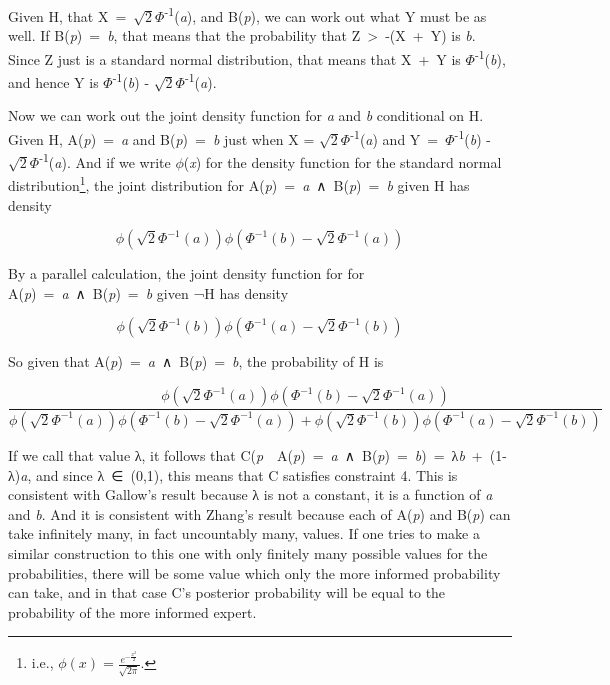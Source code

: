 \documentclass[
  11pt,
  letterpaper,
  DIV=11,
  numbers=noendperiod,
  twoside]{scrartcl}
\begin{document}
Given H, that X~=~\(\sqrt{2}\Phi\)\textsuperscript{-1}(\emph{a}), and
B(\emph{p}), we can work out what Y must be as well. If
B(\emph{p})~=~\emph{b}, that means that the probability that
Z~\textgreater~-(X~+~Y) is \emph{b}. Since Z just is a standard normal
distribution, that means that X~+~Y is
\(\Phi\)\textsuperscript{-1}(\emph{b}), and hence Y is
\(\Phi\)\textsuperscript{-1}(\emph{b}) -
\(\sqrt{2}\Phi\)\textsuperscript{-1}(\emph{a}).

Now we can work out the joint density function for \emph{a} and \emph{b}
conditional on H. Given H, A(\emph{p})~=~\emph{a} and
B(\emph{p})~=~\emph{b} just when X =
\(\sqrt{2}\Phi\)\textsuperscript{-1}(\emph{a}) and
Y~=~\(\Phi\)\textsuperscript{-1}(\emph{b}) -
\(\sqrt{2}\Phi\)\textsuperscript{-1}(\emph{a}). And if we write
\(\phi\)(\emph{x}) for the density function for the standard normal
distribution\footnote{i.e.,
  \(\phi(x) = \frac{e^{-\frac{x^2}{2}}}{\sqrt{2\pi}}\).}, the joint
distribution for A(\emph{p})~=~\emph{a}~∧~B(\emph{p})~=~\emph{b} given H
has density

\[
\phi(\sqrt{2}\Phi^{-1}(a)) \phi(\Phi^{-1}(b) - \sqrt{2}\Phi^{-1}(a))
\]

\noindent By a parallel calculation, the joint density function for for
A(\emph{p})~=~\emph{a}~∧~B(\emph{p})~=~\emph{b} given ¬H has density

\[
\phi(\sqrt{2}\Phi^{-1}(b)) \phi(\Phi^{-1}(a) - \sqrt{2}\Phi^{-1}(b))
\]

\noindent  So given that
A(\emph{p})~=~\emph{a}~∧~B(\emph{p})~=~\emph{b}, the probability of H is

\[
\frac{
\phi(\sqrt{2}\Phi^{-1}(a)) \phi(\Phi^{-1}(b) - \sqrt{2}\Phi^{-1}(a))
}{
\phi(\sqrt{2}\Phi^{-1}(a)) \phi(\Phi^{-1}(b) - \sqrt{2}\Phi^{-1}(a)) + \phi(\sqrt{2}\Phi^{-1}(b)) \phi(\Phi^{-1}(a) - \sqrt{2}\Phi^{-1}(b))
}
\]

\noindent If we call that value λ, it follows that
C(\emph{p}~\textbar~A(\emph{p})~=~\emph{a}~∧~B(\emph{p})~=~\emph{b})~=~λ\emph{b}~+~(1-λ)\emph{a},
and since λ~∈~(0,1), this means that C satisfies constraint 4. This is
consistent with Gallow's result because λ is not a constant, it is a
function of \emph{a} and \emph{b}. And it is consistent with Zhang's
result because each of A(\emph{p}) and B(\emph{p}) can take infinitely
many, in fact uncountably many, values. If one tries to make a similar
construction to this one with only finitely many possible values for the
probabilities, there will be some value which only the more informed
probability can take, and in that case C's posterior probability will be
equal to the probability of the more informed expert.
\end{document}
